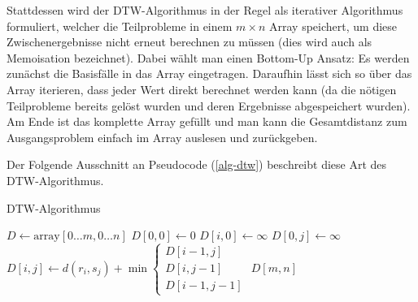 \documentclass{whswinvcbook}
\begin{document}
Stattdessen wird der DTW-Algorithmus in der Regel als iterativer Algorithmus formuliert, welcher die Teilprobleme in einem $m\times n$ Array speichert, um diese Zwischenergebnisse nicht erneut berechnen zu müssen (dies wird auch als Memoisation bezeichnet). Dabei wählt man einen Bottom-Up Ansatz: Es werden zunächst die Basisfälle in das Array eingetragen. Daraufhin lässt sich so über das Array iterieren, dass jeder Wert direkt berechnet werden kann (da die nötigen Teilprobleme bereits gelöst wurden und deren Ergebnisse abgespeichert wurden). Am Ende ist das komplette Array gefüllt und man kann die Gesamtdistanz zum Ausgangsproblem einfach im Array auslesen und zurückgeben.

Der Folgende Ausschnitt an Pseudocode (\ref{alg-dtw}) beschreibt diese Art des DTW-Algorithmus.
\begin{algorithm}[H]
    \caption{DTW-Algorithmus}\label{alg-dtw}
    \begin{algorithmic}[1]
            \State $D\gets\text{array}[0\dots m,0\dots n]$
            \State $D[0,0]\gets0$
                \State $D[i,0]\gets\infty$
            \EndFor
                \State $D[0,j]\gets\infty$
            \EndFor
                    \State $D[i,j]\gets d(r_i,s_j)+\min\begin{cases}D[i-1,j]\\D[i,j-1]\\D[i-1,j-1]\end{cases}$
                \EndFor
            \EndFor
            \State \Return $D[m,n]$
        \EndFunction
    \end{algorithmic}
\end{algorithm}
\end{document}
